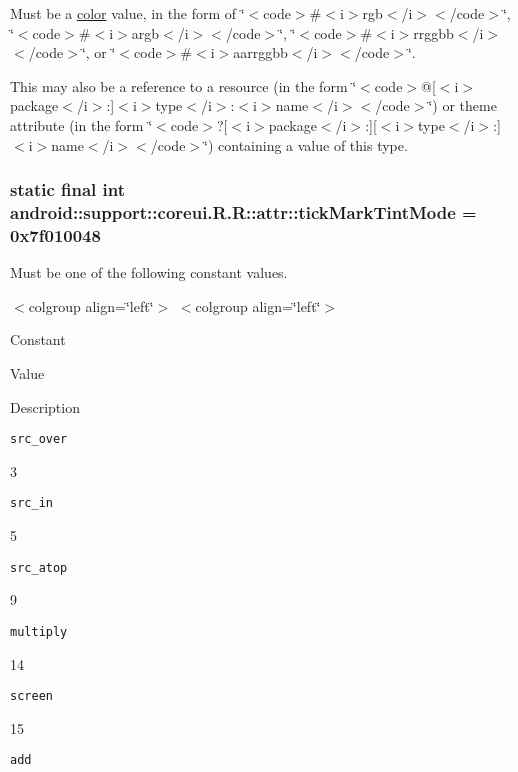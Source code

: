 Must be a \hyperlink{classandroid_1_1support_1_1coreui_1_1_r_1_1color}{color} value, in the form of \char`\"{}$<$code$>$\#$<$i$>$rgb$<$/i$>$$<$/code$>$\char`\"{}, \char`\"{}$<$code$>$\#$<$i$>$argb$<$/i$>$$<$/code$>$\char`\"{}, \char`\"{}$<$code$>$\#$<$i$>$rrggbb$<$/i$>$$<$/code$>$\char`\"{}, or \char`\"{}$<$code$>$\#$<$i$>$aarrggbb$<$/i$>$$<$/code$>$\char`\"{}. 

This may also be a reference to a resource (in the form \char`\"{}$<$code$>$@\mbox{[}$<$i$>$package$<$/i$>$:\mbox{]}$<$i$>$type$<$/i$>$:$<$i$>$name$<$/i$>$$<$/code$>$\char`\"{}) or theme attribute (in the form \char`\"{}$<$code$>$?\mbox{[}$<$i$>$package$<$/i$>$:\mbox{]}\mbox{[}$<$i$>$type$<$/i$>$:\mbox{]}$<$i$>$name$<$/i$>$$<$/code$>$\char`\"{}) containing a value of this type. \hypertarget{classandroid_1_1support_1_1coreui_1_1_r_1_1attr_2a60ce4e0aea240ec318f26dd746bcf9}{
\subsubsection[{tickMarkTintMode}]{\setlength{\rightskip}{0pt plus 5cm}static final int android::support::coreui.R.R::attr::tickMarkTintMode = 0x7f010048}}
\label{classandroid_1_1support_1_1coreui_1_1_r_1_1attr_2a60ce4e0aea240ec318f26dd746bcf9}


Must be one of the following constant values. \begin{TabularC}{0}
\hline
\end{TabularC}
$<$colgroup align=\char`\"{}left\char`\"{}$>$ $<$colgroup align=\char`\"{}left\char`\"{}$>$ 

Constant

Value

Description 

{\tt src\_\-over}

3

{\tt src\_\-in}

5

{\tt src\_\-atop}

9

{\tt multiply}

14

{\tt screen}

15

{\tt add}

